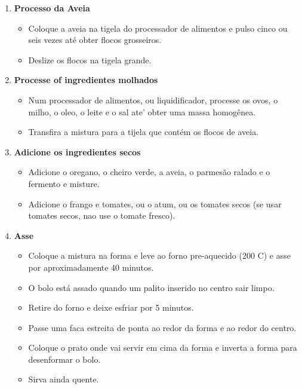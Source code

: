 \documentclass[11pt,letterpaper]{article}
\begin{document}
\begin{description}
\begin{enumerate}
	\item {\bf Processo da Aveia}
	\begin{itemize}
	\item Coloque a aveia na tigela do processador de alimentos e pulso cinco ou seis vezes at\'e obter flocos grosseiros.
	\item Deslize os flocos na tigela grande.
	\end {itemize}

	\item {\bf Processe of ingredientes molhados}
	\begin{itemize}
	\item Num processador de alimentos, ou liquidificador, processe os ovos, o milho, o oleo, o leite e o sal ate' obter uma massa homog\^enea.
        \item Transfira a mistura para a tijela que cont\'em os flocos de aveia.
	\end{itemize}
	\item {\bf Adicione os ingredientes secos}
	\begin{itemize}
	\item Adicione o oregano, o cheiro verde, a aveia, o parmes\~ao ralado e o fermento e misture.
	\item  Adicione o frango e tomates, ou o atum, ou os tomates secos (se usar tomates secos, nao use o tomate fresco).
	\end{itemize}
	\item {\bf Asse}
	\begin{itemize}
	\item Coloque a mistura na forma e leve ao forno pre-aquecido (200 C) e asse por aproximadamente 40 minutos.
	\item O bolo est\'a assado quando um palito inserido no centro sair limpo.
	\item Retire do forno e deixe esfriar por 5 minutos.
	\item Passe uma faca estreita de ponta ao redor da forma e ao redor do centro.
	\item Coloque o prato onde vai servir em cima da forma e inverta a forma para desenformar o bolo.
	\item Sirva ainda quente.
	\end{itemize}
	\end{enumerate}
\end{description}
\end{document}
